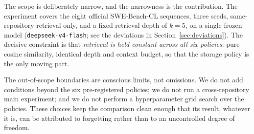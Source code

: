 The scope is deliberately narrow, and the narrowness is the contribution. The experiment
covers the eight official SWE-Bench-CL sequences, three seeds, same-repository retrieval
only, and a fixed retrieval depth of $k=5$, on a single frozen model
(\texttt{deepseek-v4-flash}; see the deviations in Section~\ref{sec:deviations}). The
decisive constraint is that \emph{retrieval is held constant across all six policies}:
pure cosine similarity, identical depth and context budget, so that the storage policy is
the only moving part.

The out-of-scope boundaries are conscious limits, not omissions. We do not add conditions
beyond the six pre-registered policies; we do not run a cross-repository main experiment;
and we do not perform a hyperparameter grid search over the policies. These choices keep
the comparison clean enough that its result, whatever it is, can be attributed to
forgetting rather than to an uncontrolled degree of freedom.
